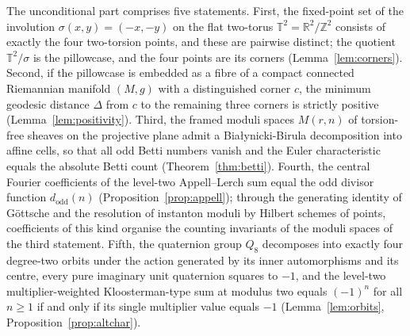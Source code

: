\documentclass[11pt,a4paper]{article}
\newcommand{\T}{\mathbb{T}}
\newcommand{\R}{\mathbb{R}}
\newcommand{\Z}{\mathbb{Z}}
\newcommand{\dodd}{d_{\mathrm{odd}}}
\newcommand{\Mod}{M}
\theoremstyle{plain}
\theoremstyle{definition}
\theoremstyle{remark}
\begin{document}
The unconditional part comprises five statements. First, the fixed-point set of the involution $\sigma(x,y) = (-x,-y)$ on the flat two-torus $\T^2 = \R^2/\Z^2$ consists of exactly the four two-torsion points, and these are pairwise distinct; the quotient $\T^2/\sigma$ is the pillowcase, and the four points are its corners (Lemma~\ref{lem:corners}). Second, if the pillowcase is embedded as a fibre of a compact connected Riemannian manifold $(M,g)$ with a distinguished corner $c$, the minimum geodesic distance $\Delta$ from $c$ to the remaining three corners is strictly positive (Lemma~\ref{lem:positivity}). Third, the framed moduli spaces $\Mod(r,n)$ of torsion-free sheaves on the projective plane admit a Bia{\l}ynicki-Birula decomposition into affine cells, so that all odd Betti numbers vanish and the Euler characteristic equals the absolute Betti count (Theorem~\ref{thm:betti}). Fourth, the central Fourier coefficients of the level-two Appell--Lerch sum equal the odd divisor function $\dodd(n)$ (Proposition~\ref{prop:appell}); through the generating identity of G\"ottsche and the resolution of instanton moduli by Hilbert schemes of points, coefficients of this kind organise the counting invariants of the moduli spaces of the third statement. Fifth, the quaternion group $Q_8$ decomposes into exactly four degree-two orbits under the action generated by its inner automorphisms and its centre, every pure imaginary unit quaternion squares to $-1$, and the level-two multiplier-weighted Kloosterman-type sum at modulus two equals $(-1)^n$ for all $n \ge 1$ if and only if its single multiplier value equals $-1$ (Lemma~\ref{lem:orbits}, Proposition~\ref{prop:altchar}).
\end{document}
